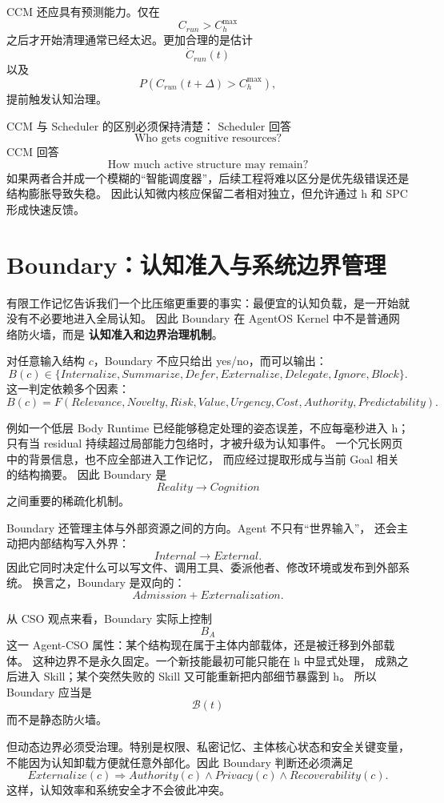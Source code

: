CCM 还应具有预测能力。仅在
\[
C_{run}>C_h^{\max}
\]
之后才开始清理通常已经太迟。更加合理的是估计
\[
\dot C_{run}(t)
\]
以及
\[
P(C_{run}(t+\Delta)>C_h^{\max}),
\]
提前触发认知治理。

CCM 与 Scheduler 的区别必须保持清楚：
Scheduler 回答
\[
\text{Who gets cognitive resources?}
\]
CCM 回答
\[
\text{How much active structure may remain?}
\]
如果两者合并成一个模糊的``智能调度器''，后续工程将难以区分是优先级错误还是结构膨胀导致失稳。
因此认知微内核应保留二者相对独立，但允许通过 h 和 SPC 形成快速反馈。


\section{Boundary：认知准入与系统边界管理}

有限工作记忆告诉我们一个比压缩更重要的事实：最便宜的认知负载，是一开始就没有不必要地进入全局认知。
因此 Boundary 在 AgentOS Kernel 中不是普通网络防火墙，而是
\textbf{认知准入和边界治理机制}。

对任意输入结构 $c$，Boundary 不应只给出 yes/no，而可以输出：
\[
B(c)
\in
\{
Internalize,
Summarize,
Defer,
Externalize,
Delegate,
Ignore,
Block
\}.
\]
这一判定依赖多个因素：
\[
B(c)
=
F(
Relevance,
Novelty,
Risk,
Value,
Urgency,
Cost,
Authority,
Predictability
).
\]

例如一个低层 Body Runtime 已经能够稳定处理的姿态误差，不应每毫秒进入 h；
只有当 residual 持续超过局部能力包络时，才被升级为认知事件。
一个冗长网页中的背景信息，也不应全部进入工作记忆，
而应经过提取形成与当前 Goal 相关的结构摘要。
因此 Boundary 是
\[
Reality\rightarrow Cognition
\]
之间重要的稀疏化机制。

Boundary 还管理主体与外部资源之间的方向。Agent 不只有``世界输入''，
还会主动把内部结构写入外界：
\[
Internal\rightarrow External.
\]
因此它同时决定什么可以写文件、调用工具、委派他者、修改环境或发布到外部系统。
换言之，Boundary 是双向的：
\[
\boxed{
Admission + Externalization.
}
\]

从 CSO 观点来看，Boundary 实际上控制
\[
B_A
\]
这一 Agent-CSO 属性：某个结构现在属于主体内部载体，还是被迁移到外部载体。
这种边界不是永久固定。一个新技能最初可能只能在 h 中显式处理，
成熟之后进入 Skill；某个突然失败的 Skill 又可能重新把内部细节暴露到 h。
所以 Boundary 应当是
\[
\mathcal B(t)
\]
而不是静态防火墙。

但动态边界必须受治理。特别是权限、私密记忆、主体核心状态和安全关键变量，
不能因为认知卸载方便就任意外部化。因此 Boundary 判断还必须满足
\[
Externalize(c)
\Rightarrow
Authority(c)\land Privacy(c)\land Recoverability(c).
\]
这样，认知效率和系统安全才不会彼此冲突。


